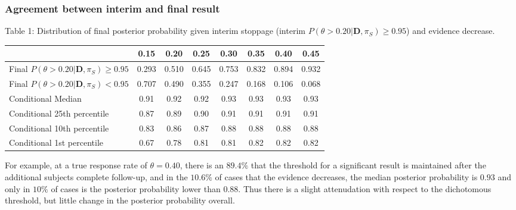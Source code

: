 \documentclass[12pt]{article}
\begin{document}
\subsubsection{Agreement between interim and final result}
\begin{center}
Table 1: Distribution of final posterior probability given interim stoppage (interim $P(\theta>0.20|\mathbf{D},\pi_S)\geq 0.95$) and evidence decrease.
\begin{tabular}{l|ccccccc}
&0.15&0.20&0.25&0.30&0.35&0.40&0.45\\
\hline
Final $P(\theta>0.20|\mathbf{D},\pi_S)\geq 0.95$ &0.293&0.510&0.645&0.753&0.832&0.894&0.932 \\ 
Final $P(\theta>0.20|\mathbf{D},\pi_S)< 0.95$&0.707&0.490&0.355&0.247&0.168&0.106&0.068\\  
\hspace{0.5in}Conditional Median&0.91&0.92&0.92&0.93&0.93&0.93&0.93\\  
\hspace{0.5in}Conditional 25th percentile&0.87&0.89&0.90&0.91&0.91&0.91&0.91\\  
\hspace{0.5in}Conditional 10th percentile&0.83&0.86&0.87&0.88&0.88&0.88&0.88\\  
\hspace{0.5in}Conditional 1st percentile&0.67&0.78&0.81&0.81&0.82&0.82&0.82
\end{tabular}
\end{center}

For example, at a true response rate of $\theta=0.40$, there is an $89.4\%$ that the threshold for a significant result is maintained after the additional subjects complete follow-up, and in the $10.6\%$ of cases that the evidence decreases, the median posterior probability is $0.93$ and only in $10\%$ of cases is the posterior probability lower than $0.88$. Thus there is a slight attenudation with respect to the dichotomous threshold, but little change in the posterior probability overall.

\newpage
\end{document}
